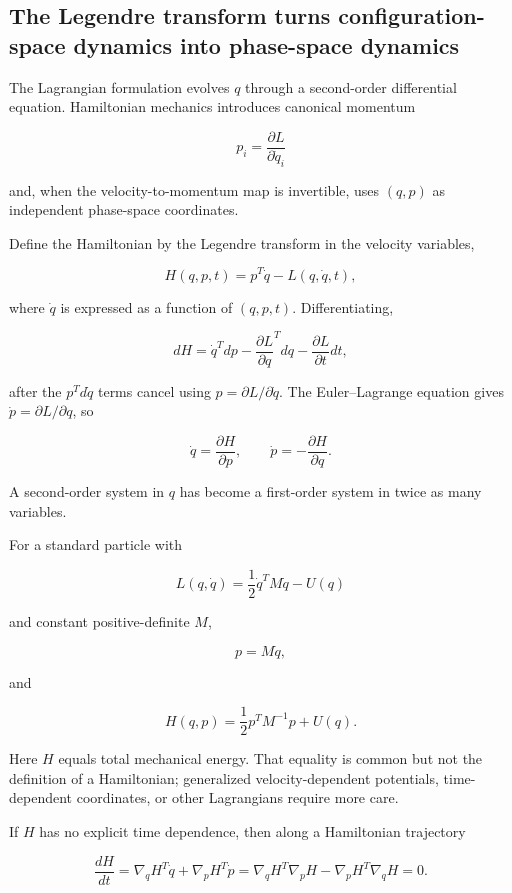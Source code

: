 \subsection{The Legendre transform turns configuration-space dynamics into phase-space dynamics}\label{02-foundations-ii-ch039-the-legendre-transform-turns-configuration-space-dynamics-into-phase-space-dynamics}

The Lagrangian formulation evolves \(q\) through a second-order differential equation. Hamiltonian mechanics introduces canonical momentum

\[
p_i
=
\frac{\partial L}{\partial\dot q_i}
\]

and, when the velocity-to-momentum map is invertible, uses \((q,p)\) as independent phase-space coordinates.

Define the Hamiltonian by the Legendre transform in the velocity variables,

\[
H(q,p,t)
=
p^T\dot q-L(q,\dot q,t),
\]

where \(\dot q\) is expressed as a function of \((q,p,t)\). Differentiating,

\[
dH
=
\dot q^Tdp
-
\frac{\partial L}{\partial q}^Tdq
-
\frac{\partial L}{\partial t}dt,
\]

after the \(p^Td\dot q\) terms cancel using \(p=\partial L/\partial\dot q\). The Euler--Lagrange equation gives \(\dot p=\partial L/\partial q\), so

\[
\boxed{
\dot q=
\frac{\partial H}{\partial p},
\qquad
\dot p=
-\frac{\partial H}{\partial q}.
}
\]

A second-order system in \(q\) has become a first-order system in twice as many variables.

For a standard particle with

\[
L(q,\dot q)
=
\frac12\dot q^TM\dot q-U(q)
\]

and constant positive-definite \(M\),

\[
p=M\dot q,
\]

and

\[
H(q,p)
=
\frac12p^TM^{-1}p+U(q).
\]

Here \(H\) equals total mechanical energy. That equality is common but not the definition of a Hamiltonian; generalized velocity-dependent potentials, time-dependent coordinates, or other Lagrangians require more care.

If \(H\) has no explicit time dependence, then along a Hamiltonian trajectory

\[
\frac{dH}{dt}
=
\nabla_qH^T\dot q
+
\nabla_pH^T\dot p
=
\nabla_qH^T\nabla_pH
-
\nabla_pH^T\nabla_qH
=
0.
\]

